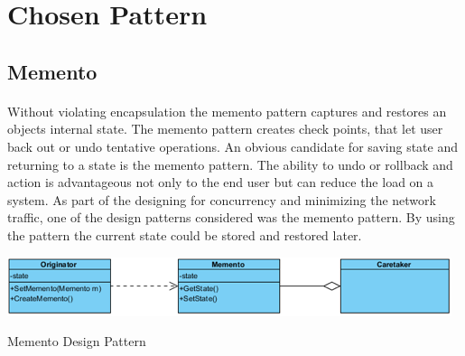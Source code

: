 \section{Chosen Pattern}
\subsection{Memento}	

	\begin{multicols}{2}
	\paragraph{}
		Without violating encapsulation the memento pattern captures and restores an objects internal state. The memento pattern creates check points, 
		that let user back out or undo tentative operations.
		\newline
		\newline
		An obvious candidate for saving state and returning to a state is the memento pattern. The ability to undo or rollback and action is 
		advantageous not only to the end user but can reduce the load on a system. As part of the designing for concurrency and minimizing the 
		network traffic, one of the design patterns considered was the memento pattern. By using the pattern the current state could be stored 
		and restored later. 
	\end{multicols}	
		\begin{figurehere}
			\includegraphics[scale=0.65]{figures/memento.png}
			\caption{Memento Design Pattern}
		\end{figurehere}

